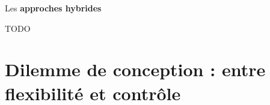 		
			
			Les \textbf{approches hybrides}
			
			\begin{leftBarExamples}
				TODO
			\end{leftBarExamples}
	
	
	\section{Dilemme de conception : entre flexibilité et contrôle}
	\label{annex:B.3-ANNEXE-CHATBOTS-DILEMME}
		
